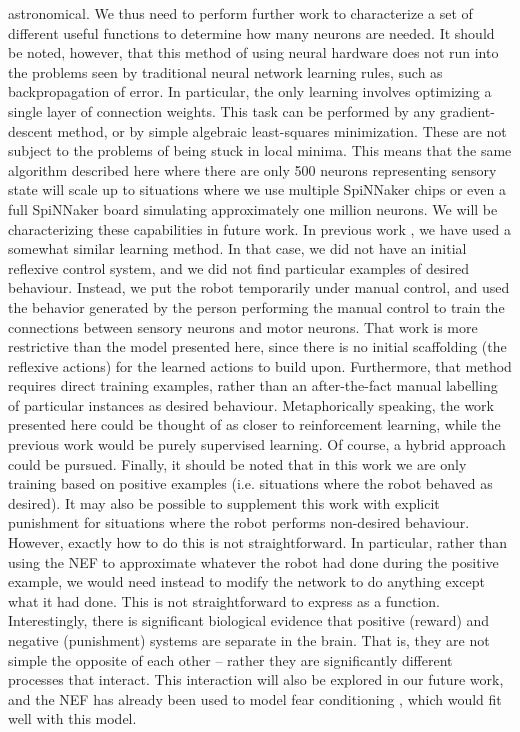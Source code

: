 \documentclass[conference]{IEEEtran}
\begin{document}
astronomical. We thus need to perform further work to
characterize a set of different useful functions to determine
how many neurons are needed.
It should be noted, however, that this method of using
neural hardware does not run into the problems seen by
traditional neural network learning rules, such as backpropagation
of error. In particular, the only learning
involves optimizing a single layer of connection weights.
This task can be performed by any gradient-descent method,
or by simple algebraic least-squares minimization. These
are not subject to the problems of being stuck in local
minima. This means that the same algorithm described here
where there are only 500 neurons representing sensory state
will scale up to situations where we use multiple SpiNNaker
chips or even a full SpiNNaker board simulating
approximately one million neurons. We will be
characterizing these capabilities in future work.
In previous work \cite{conradt2014trainable}, we have used a somewhat similar
learning method. In that case, we did not have an initial
reflexive control system, and we did not find particular
examples of desired behaviour. Instead, we put the robot
temporarily under manual control, and used the behavior
generated by the person performing the manual control to
train the connections between sensory neurons and motor
neurons. That work is more restrictive than the model
presented here, since there is no initial scaffolding (the
reflexive actions) for the learned actions to build upon.
Furthermore, that method requires direct training examples,
rather than an after-the-fact manual labelling of particular
instances as desired behaviour. Metaphorically speaking, the
work presented here could be thought of as closer to
reinforcement learning, while the previous work would be
purely supervised learning. Of course, a hybrid approach
could be pursued.
Finally, it should be noted that in this work we are only
training based on positive examples (i.e. situations where
the robot behaved as desired). It may also be possible to
supplement this work with explicit punishment for situations where the robot performs non-desired behaviour.
However, exactly how to do this is not straightforward. In
particular, rather than using the NEF to approximate
whatever the robot had done during the positive example,
we would need instead to modify the network to do
anything except what it had done. This is not
straightforward to express as a function. Interestingly, there
is significant biological evidence that positive (reward) and
negative (punishment) systems are separate in the brain.
That is, they are not simple the opposite of each other –
rather they are significantly different processes that interact.
This interaction will also be explored in our future work,
and the NEF has already been used to model fear
conditioning \cite{kolbeck2013fear}, which would fit well with this model.
\end{document}
